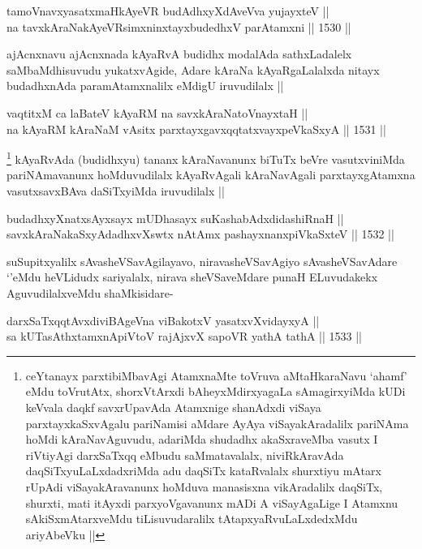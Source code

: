 \begin{shl}
tamoVnavxyasatxmaHkAyeVR budAdhxyXdAveVva yujayxteV || \\
na tavxkAraNakAyeVR\s simxninxtayxbudedhxV parAtamxni ||  1530 ||  
\end{shl}

\begin{artha}
ajAcnxnavu ajAcnxnada kAyaRvA budidhx modalAda sathxLadalelx saMbaMdhisuvudu yukatxvAgide, Adare kAraNa kAyaRgaLalalxda nitayx budadhxnAda paramAtamxnalilx eMdigU iruvudilalx ||
\end{artha}

\begin{shl}
vaqtitxM ca laBateV kAyaRM na savxkAraNatoV\s nayxtaH ||  \\
na kAyaRM kAraNaM vA\s sitx parxtayxgavxqqtatxvayxpeVkaSxyA ||  1531 ||  
\end{shl}

\begin{artha}
\footnote{ceYtanayx parxtibiMbavAgi AtamxnaMte toVruva aMtaHkaraNavu `ahamf' eMdu toVrutAtx, shorxVtArxdi bAheyxMdirxyagaLa sAmagirxyiMda kUDi keVvala daqkf savxrUpavAda Atamxnige shanAdxdi viSaya parxtayxkaSxvAgalu pariNamisi aMdare AyAya viSayakAradalilx pariNAma hoMdi kAraNavAguvudu, adariMda shudadhx akaSxraveMba vasutx I riVtiyAgi darxSaTxqq eMbudu saMmatavalalx, niviRkAravAda daqSiTxyuLaLxdadxriMda adu daqSiTx kataRvalalx shurxtiyu mAtarx rUpAdi viSayakAravanunx hoMduva manasisxna vikAradalilx daqSiTx, shurxti, mati itAyxdi parxyoVgavanunx mADi A viSayAgaLige I Atamxnu sAkiSxmAtarxveMdu tiLisuvudaralilx tAtapxyaRvuLaLxdedxMdu ariyAbeVku ||}
kAyaRvAda (budidhxyu) tananx kAraNavanunx biTuTx beVre vasutxviniMda pariNAmavanunx hoMduvudilalx kAyaRvAgali kAraNavAgali parxtayxgAtamxna vasutxsavxBAva daSiTxyiMda iruvudilalx ||
\end{artha}
\begin{shl}
budadhxyXnatxsAyxsayx mUDhasayx suKashabAdxdidashiRnaH || \\
savxkAraNakaSxyAdadhxvXswtx nA\s \s tAmx pashayxnanxpiVkaSxteV ||  1532 ||  
\end{shl}
				
\begin{artha}
suSupitxyalilx sAvasheVSavAgilayavo, niravasheVSavAgiyo sAvasheVSavAdare `\stext'eMdu heVLidudx sariyalalx, nirava sheVSaveMdare punaH ELuvudakekx AguvudilalxveMdu shaMkisidare-
\end{artha}

\begin{shl}
darxSaTxqqtAvxdiviBAgeVna viBakotxV yasatxvXvidayxyA ||  \\
sa kUTasAthxtamxnA\s piVtoV rajAjxvX sapoVR yathA tathA ||  1533 ||  
\end{shl}

